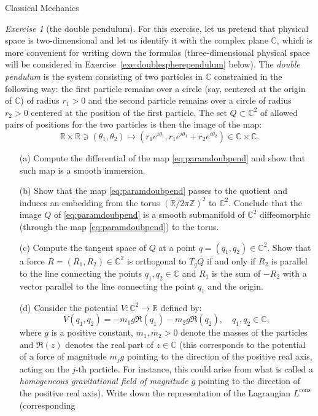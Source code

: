 \documentclass[oneside,a4paper,11pt]{amsbook}
\newcommand{\R}{\mathds R}
\newcommand{\C}{\mathds C}
\newcommand{\Z}{\mathds Z}
\theoremstyle{remark}\newtheorem{exercise}{Exercise}[chapter]
\theoremstyle{plain}\newtheorem{teo}{Theorem}[section]
\theoremstyle{plain}\newtheorem{lem}[teo]{Lemma}
\theoremstyle{plain}\newtheorem{prop}[teo]{Proposition}
\theoremstyle{plain}\newtheorem{cor}[teo]{Corollary}
\theoremstyle{definition}\newtheorem{defin}[teo]{Definition}
\theoremstyle{remark}\newtheorem{rem}[teo]{Remark}
\theoremstyle{definition}\newtheorem{notation}[teo]{Notation}
\theoremstyle{definition}\newtheorem{convention}[teo]{Convention}
\theoremstyle{definition}\newtheorem{example}[teo]{Example}
\numberwithin{section}{chapter}
\numberwithin{equation}{section}
\begin{document}
\begin{chapter}{Classical Mechanics}
\begin{exercise}[the double pendulum]\label{exe:doublependulum}
For this exercise, let us pretend that physical space is two-dimensional and let us identify it with the complex
plane $\C$, which is more convenient for writing down the formulas (three-dimensional physical space will
be considered in Exercise~\ref{exe:doublespherependulum} below).
The {\em double pendulum\/} is the system consisting of two particles in $\C$ constrained in the following
way: the first particle remains over a circle (say, centered at the origin of $\C$) of radius $r_1>0$ and the
second particle remains over a circle of radius $r_2>0$ centered at the position of the first particle. The set
$Q\subset\C^2$ of allowed pairs of positions for the two particles is then the image of the map:
\begin{equation}\label{eq:paramdoubpend}
\R\times\R\ni(\theta_1,\theta_2)\longmapsto(r_1e^{i\theta_1},r_1e^{i\theta_1}+r_2e^{i\theta_2})\in\C\times\C.
\end{equation}
\begin{itemize}
\item[(a)] Compute the differential of the map \eqref{eq:paramdoubpend} and show that such map is a smooth immersion.
\item[(b)] Show that the map \eqref{eq:paramdoubpend} passes to the quotient and induces an embedding from the
torus $(\R/2\pi\Z)^2$ to $\C^2$. Conclude that the image $Q$ of \eqref{eq:paramdoubpend} is a smooth submanifold
of $\C^2$ diffeomorphic (through the map \eqref{eq:paramdoubpend}) to the torus.
\item[(c)] Compute the tangent space of $Q$ at a point $q=(q_1,q_2)\in\C^2$. Show that a force $R=(R_1,R_2)\in\C^2$
is orthogonal to $T_qQ$ if and only if $R_2$ is parallel to the line connecting the points $q_1,q_2\in\C$ and
$R_1$ is the sum of $-R_2$ with a vector parallel to the line connecting the point $q_1$ and the origin.
\item[(d)] Consider the potential $V:\C^2\to\R$ defined by:
\[V(q_1,q_2)=-m_1g\Re(q_1)-m_2g\Re(q_2),\quad q_1,q_2\in\C,\]
where $g$ is a positive constant, $m_1,m_2>0$ denote the masses of the particles and $\Re(z)$ denotes the
real part of $z\in\C$ (this corresponds to the potential of a force of magnitude $m_jg$ pointing to the
direction of the positive real axis, acting on the $j$-th particle. For instance, this could arise from
what is called a {\em homogeneous gravitational field of magnitude $g$\/} pointing to the direction of the
positive real axis). Write down the representation of the Lagrangian $L^{\mathrm{cons}}$ (corresponding

\end{itemize}
\end{exercise}
\end{chapter}
\end{document}
